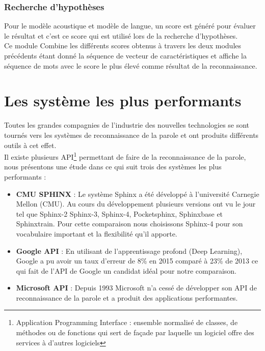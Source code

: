 \subsubsection{Recherche d'hypothèses}
Pour le modèle acoustique et modèle de langue, un score est généré pour évaluer le résultat et c’est ce score qui est utilisé lors de la recherche d’hypothèses.\\
Ce module  Combine les différents scores obtenus à travers les deux modules précédents étant donné la séquence de vecteur de caractéristiques et affiche la séquence de mots avec le score le plus élevé comme résultat de la reconnaissance.\cite{deeplearningapproach}

\section{Les système les plus performants}
Toutes les grandes compagnies de l’industrie des nouvelles technologies se sont tournés vers les systèmes de reconnaissance de la parole et ont produits différents outils à cet effet.\\
Il existe plusieurs API\footnote{Application Programming Interface : ensemble normalisé de classes, de méthodes ou de fonctions qui sert de façade par laquelle un logiciel offre des services à d'autres logiciels} permettant de faire de la reconnaissance de la parole, nous présentons une étude dans ce qui suit trois des systèmes les plus performants :\cite{compareapi} \\
\begin{itemize}
    \item \textbf{CMU SPHINX} : Le système Sphinx a été développé à l’université Carnegie Mellon (CMU). Au cours du développement plusieurs versions ont vu le jour tel que Sphinx-2 Sphinx-3, Sphinx-4, Pocketsphinx, Sphinxbase et Sphinxtrain. Pour cette comparaison nous choisissons Sphinx-4 pour son vocabulaire important et la flexibilité qu’il apporte.
    \item \textbf{Google API} : En utilisant de l’apprentissage profond (Deep Learning), Google a pu avoir un taux d'erreur de 8\% en 2015 comparé à 23\% de 2013 ce qui fait de l’API de Google un candidat idéal pour notre comparaison.
    \item \textbf{Microsoft API} : Depuis 1993 Microsoft n’a cessé de développer son API de reconnaissance de la parole et a produit des applications performantes.
\end{itemize}

